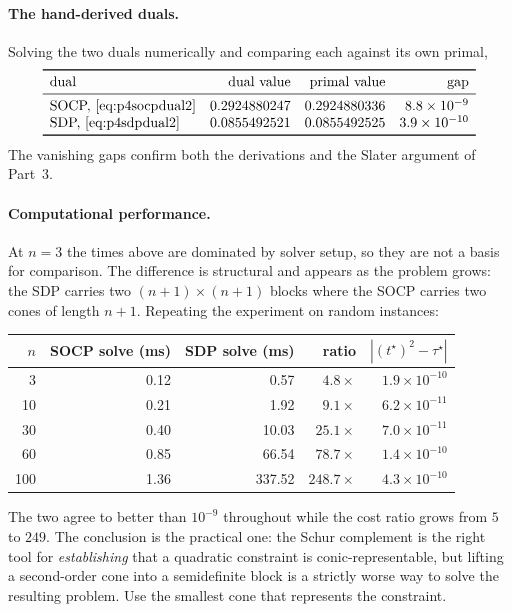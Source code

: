 \documentclass[11pt]{article}
\theoremstyle{definition}
\begin{document}
\paragraph{The hand-derived duals.} Solving the two duals
numerically and comparing each against its own primal,
\[
  \begin{array}{lrrr}
    \toprule
    \text{dual} & \text{dual value} & \text{primal value}
      & \text{gap}\\
    \midrule
    \text{SOCP, \eqref{eq:p4socpdual2}}
      & 0.2924880247 & 0.2924880336 & 8.8\times10^{-9}\\
    \text{SDP, \eqref{eq:p4sdpdual2}}
      & 0.0855492521 & 0.0855492525 & 3.9\times10^{-10}\\
    \bottomrule
  \end{array}
\]
The vanishing gaps confirm both the derivations and the Slater
argument of Part~3.

\paragraph{Computational performance.} At $n = 3$ the times above are
dominated by solver setup, so they are not a basis for comparison. The
difference is structural and appears as the problem grows: the SDP
carries two $(n+1)\times(n+1)$ blocks where the SOCP carries two cones
of length $n+1$. Repeating the experiment on random instances:

\begin{center}
\begin{tabular}{@{}rrrrr@{}}
\toprule
$n$ & SOCP solve (ms) & SDP solve (ms) & ratio
  & $|(t^\star)^2 - \tau^\star|$\\
\midrule
  3 & 0.12 &   0.57 & $4.8\times$   & $1.9\times10^{-10}$\\
 10 & 0.21 &   1.92 & $9.1\times$   & $6.2\times10^{-11}$\\
 30 & 0.40 &  10.03 & $25.1\times$  & $7.0\times10^{-11}$\\
 60 & 0.85 &  66.54 & $78.7\times$  & $1.4\times10^{-10}$\\
100 & 1.36 & 337.52 & $248.7\times$ & $4.3\times10^{-10}$\\
\bottomrule
\end{tabular}
\end{center}

The two agree to better than $10^{-9}$ throughout while the cost ratio
grows from $5$ to $249$. The conclusion is the practical one: the Schur
complement is the right tool for \emph{establishing} that a quadratic
constraint is conic-representable, but lifting a second-order cone into
a semidefinite block is a strictly worse way to solve the resulting
problem. Use the smallest cone that represents the constraint.
\end{document}
